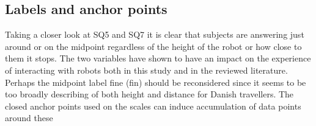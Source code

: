 \subsection{Labels and anchor points}
Taking a closer look at SQ5 and SQ7 it is clear that subjects are answering just around or on the midpoint regardless of the height of the robot or how close to them it stops. The two variables have shown to have an impact on the experience of interacting with robots both in this study and in the reviewed literature. Perhaps the midpoint label fine (fin) should be reconsidered since it seems to be too broadly describing of both height and distance for Danish travellers. The closed anchor points used on the scales can induce accumulation of data points around these 
